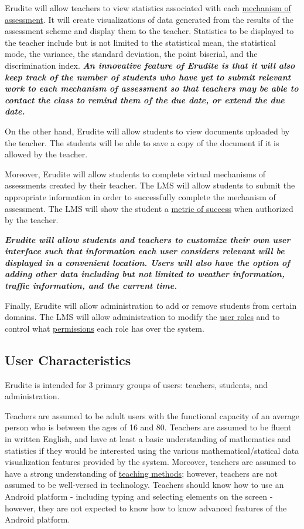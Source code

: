 \documentclass[]{article}
\begin{document}
Erudite will allow teachers to view statistics associated with each
\underline{mechanism of assessment}. It will create visualizations of data
generated from the results of the assessment scheme and display them to the
teacher. Statistics to be displayed to the teacher include but is not limited
to the statistical mean, the statistical mode, the variance, the standard
deviation, the point biserial, and the discrimination index. \emph{\textbf{ An
innovative feature of Erudite is that it will also keep track of the number of
students who have yet to submit relevant work to each mechanism of assessment
so that teachers may be able to contact the class to remind them of the due
date, or extend the due date.}}

On the other hand, Erudite will allow students to view documents uploaded by
the teacher. The students will be able to save a copy of the document if it is
allowed by the teacher.

Moreover, Erudite will allow students to complete virtual mechanisms of
assessments created by their teacher. The LMS will allow students to submit the
appropriate information in order to successfully complete the mechanism of
assessment. The LMS will show the student a \underline{metric of success} when
authorized by the teacher.

\emph{ \textbf{
  Erudite will allow students and teachers to customize their own user
  interface such that information each user considers relevant will be
  displayed in a convenient location. Users will also have the option of adding
  other data including but not limited to weather information, traffic
  information, and the current time.
} }

Finally, Erudite will allow administration to add or remove students from
certain domains. The LMS will allow administration to modify the
\underline{user roles} and to control what \underline{permissions} each role
has over the system.

\subsection{User Characteristics}
\label{sub:user_characteristics}
Erudite is intended for 3 primary groups of users: teachers, students, and
administration.

Teachers are assumed to be adult users with the functional capacity of an
average person who is between the ages of 16 and 80. Teachers are assumed to be
fluent in written English, and have at least a basic understanding of
mathematics and statistics if they would be interested using the various
mathematical/statical data visualization features provided by the system.
Moreover, teachers are assumed to have a strong understanding of
\underline{teaching methods}; however, teachers are not assumed to be
well-versed in technology. Teachers should know how to use an Android platform
- including typing and selecting elements on the screen - however, they are not
expected to know how to know advanced features of the Android platform.
\end{document}
